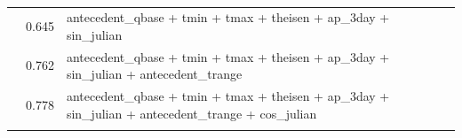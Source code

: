 \documentclass[12pt]{article}
\begin{document}
\begin{table}[h]
\begin{center}
\begin{tabular}{lrl}
 & 0.645 & antecedent\_qbase + tmin + tmax + theisen + ap\_3day + sin\_julian\\ 
 & 0.762 & antecedent\_qbase + tmin + tmax + theisen + ap\_3day + sin\_julian + antecedent\_trange\\ 
 & 0.778 & antecedent\_qbase + tmin + tmax + theisen + ap\_3day + sin\_julian + antecedent\_trange + cos\_julian\\ 
\vspace{2mm}\\     \end{tabular}
    \caption{\label{r_square_nosnow}}
    \end{center}
\end{table}
\end{document}
